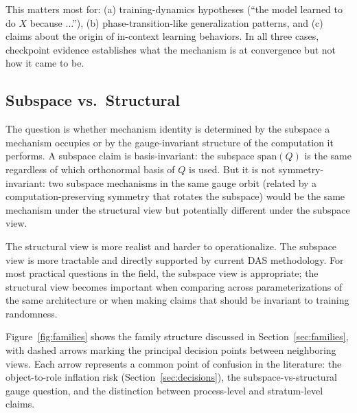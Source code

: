 \documentclass[11pt]{article}
\theoremstyle{remark}
\begin{document}
This matters most for: (a) training-dynamics hypotheses (``the model
learned to do $X$ because ...''), (b) phase-transition-like generalization
patterns, and (c) claims about the origin of in-context learning
behaviors.  In all three cases, checkpoint evidence establishes what
the mechanism is at convergence but not how it came to be.

\subsection{Subspace vs.\ Structural}

The question is whether mechanism identity is determined by the subspace
a mechanism occupies or by the gauge-invariant structure of the
computation it performs.  A subspace claim is basis-invariant: the
subspace $\mathrm{span}(Q)$ is the same regardless of which orthonormal
basis of $Q$ is used.  But it is not symmetry-invariant: two subspace
mechanisms in the same gauge orbit (related by a computation-preserving
symmetry that rotates the subspace) would be the same mechanism under
the structural view but potentially different under the subspace view.

The structural view is more realist and harder to operationalize.  The
subspace view is more tractable and directly supported by current DAS
methodology.  For most practical questions in the field, the subspace
view is appropriate; the structural view becomes important when
comparing across parameterizations of the same architecture or when
making claims that should be invariant to training randomness.


Figure~\ref{fig:families} shows the family structure discussed in
Section~\ref{sec:families}, with dashed arrows marking the principal
decision points between neighboring views.  Each arrow represents a
common point of confusion in the literature: the object-to-role
inflation risk (Section~\ref{sec:decisions}), the subspace-vs-structural
gauge question, and the distinction between process-level and
stratum-level claims.
\end{document}
